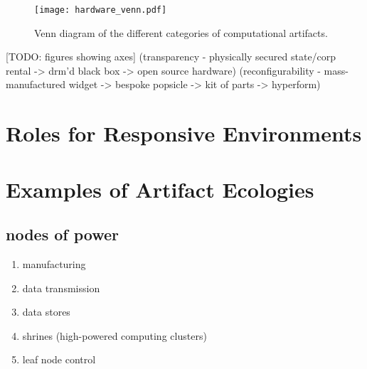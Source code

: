 \begin{figure}[tb]
  \centering
    \texttt{[image: hardware\_venn.pdf]}
  \caption{Venn diagram of the different categories of computational artifacts.}
  \label{fig:hardware_venn}
\end{figure}



[TODO: figures showing axes] (transparency - physically secured state/corp rental -> drm'd black box -> open source hardware) (reconfigurability - mass-manufactured widget -> bespoke popsicle -> kit of parts -> hyperform)

\section{Roles for Responsive Environments}
\label{sec:roles}
%

\section{Examples of Artifact Ecologies}
\label{sec:artifact_ecologies}
%
\subsection{nodes of power}
        \begin{enumerate}
            \item manufacturing
            \item data transmission
            \item data stores
            \item shrines (high-powered computing clusters)
            \item leaf node control
        \end{enumerate}        


